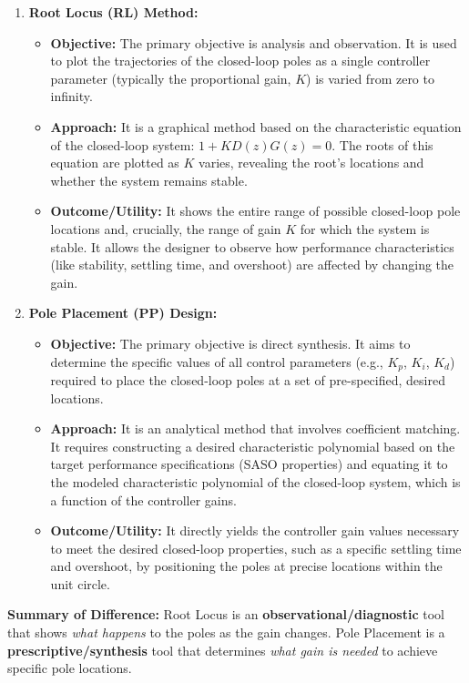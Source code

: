 \documentclass[a4paper,12pt]{article}
\begin{document}
\begin{enumerate}
    \item \textbf{Root Locus (RL) Method:}
    \begin{itemize}
        \item \textbf{Objective:} The primary objective is analysis and observation. It is used to plot the trajectories of the closed-loop poles as a single controller parameter (typically the proportional gain, $K$) is varied from zero to infinity.
        \item \textbf{Approach:} It is a graphical method based on the characteristic equation of the closed-loop system: $1 + K D(z) G(z) = 0$. The roots of this equation are plotted as $K$ varies, revealing the root's locations and whether the system remains stable.
        \item \textbf{Outcome/Utility:} It shows the entire range of possible closed-loop pole locations and, crucially, the range of gain $K$ for which the system is stable. It allows the designer to observe how performance characteristics (like stability, settling time, and overshoot) are affected by changing the gain.
    \end{itemize}

    \item \textbf{Pole Placement (PP) Design:}
    \begin{itemize}
        \item \textbf{Objective:} The primary objective is direct synthesis. It aims to determine the specific values of all control parameters (e.g., $K_p$, $K_i$, $K_d$) required to place the closed-loop poles at a set of pre-specified, desired locations.
        \item \textbf{Approach:} It is an analytical method that involves coefficient matching. It requires constructing a desired characteristic polynomial based on the target performance specifications (SASO properties) and equating it to the modeled characteristic polynomial of the closed-loop system, which is a function of the controller gains.
        \item \textbf{Outcome/Utility:} It directly yields the controller gain values necessary to meet the desired closed-loop properties, such as a specific settling time and overshoot, by positioning the poles at precise locations within the unit circle.
    \end{itemize}
\end{enumerate}

\textbf{Summary of Difference:} Root Locus is an \textbf{observational/diagnostic} tool that shows \textit{what happens} to the poles as the gain changes. Pole Placement is a \textbf{prescriptive/synthesis} tool that determines \textit{what gain is needed} to achieve specific pole locations.
\end{document}
